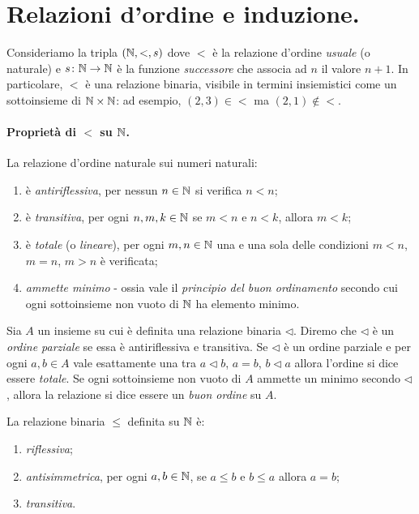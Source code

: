 \section{Relazioni d'ordine e induzione.}

Consideriamo la tripla \(\left(\mathbb{N}, <, s \right)\) dove \(<\) è la relazione d'ordine \emph{usuale} (o naturale) e \(s \colon \mathbb{N} \to \mathbb{N}\) è la funzione \emph{successore} che associa ad \(n\) il valore \(n+1\). In particolare, \(<\) è una relazione binaria, visibile in termini insiemistici come un sottoinsieme di \(\mathbb{N} \times \mathbb{N}\): ad esempio, \((2,3) \in <\) ma \((2,1) \notin <\).

\paragraph{Proprietà di \(<\) su \(\mathbb{N}\).} La relazione d'ordine naturale sui numeri naturali:
\begin{enumerate}
  \item è \emph{antiriflessiva}, per nessun \(n \in \mathbb{N}\) si verifica \(n < n\);
  \item è \emph{transitiva}, per ogni \(n, m, k \in \mathbb{N}\) se \(m < n\) e \(n < k\), allora \(m < k\);
  \item è \emph{totale} (o \emph{lineare}), per ogni \(m,n \in \mathbb{N}\) una e una sola delle condizioni \(m < n\), \(m = n\), \(m > n\) è verificata;
  \item \emph{ammette minimo} - ossia vale il \emph{principio del buon ordinamento} secondo cui ogni sottoinsieme non vuoto di \(\mathbb{N}\) ha elemento minimo.
\end{enumerate}

\begin{dfn} Sia \(A\) un insieme su cui è definita una relazione binaria \(\lhd\). Diremo che \(\lhd\) è un \emph{ordine parziale} se essa è antiriflessiva e transitiva. Se \(\lhd\) è un ordine parziale e per ogni \(a,b \in A\) vale esattamente una tra \(a \lhd b\), \(a = b\), \(b \lhd a\) allora l'ordine si dice essere \emph{totale}. Se ogni sottoinsieme non vuoto di \(A\) ammette un minimo secondo \(\lhd\), allora la relazione si dice essere un \emph{buon ordine} su \(A\).
\end{dfn}

\begin{prp} La relazione binaria \(\le\) definita su \(\mathbb{N}\) è:
  \begin{enumerate}
    \item \emph{riflessiva};
    \item \emph{antisimmetrica}, per ogni \(a, b \in \mathbb{N}\), se \(a \le b\) e \(b \le a\) allora \(a = b\);
    \item \emph{transitiva}.
  \end{enumerate}
\end{prp}


